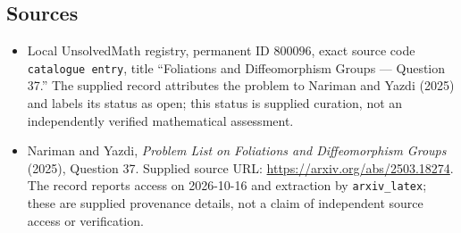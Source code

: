 \documentclass[11pt]{article}
\begin{document}
\subsection{Sources}
\begin{itemize}
\item Local UnsolvedMath registry, permanent ID \(800096\), exact source code \texttt{catalogue entry}, title ``Foliations and Diffeomorphism Groups --- Question 37.'' The supplied record attributes the problem to Nariman and Yazdi (2025) and labels its status as open; this status is supplied curation, not an independently verified mathematical assessment.
\item Nariman and Yazdi, \emph{Problem List on Foliations and Diffeomorphism Groups} (2025), Question 37. Supplied source URL: \url{https://arxiv.org/abs/2503.18274}. The record reports access on 2026-10-16 and extraction by \texttt{arxiv\_latex}; these are supplied provenance details, not a claim of independent source access or verification.
\end{itemize}
\end{document}
